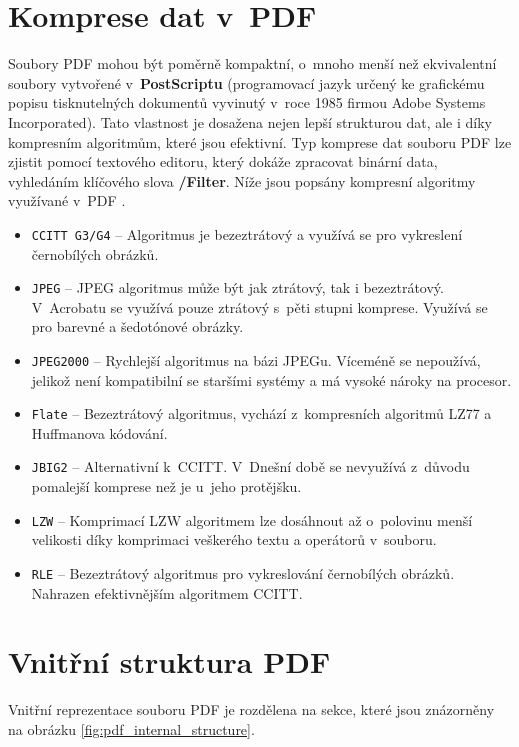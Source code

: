 \section{Komprese dat v~PDF}
\label{sec:komprese}
Soubory PDF mohou být poměrně kompaktní, o~mnoho menší než ekvivalentní soubory vytvořené v~\textbf{PostScriptu} (programovací jazyk určený ke grafickému popisu tisknutelných dokumentů vyvinutý v~roce 1985 firmou Adobe Systems Incorporated). Tato vlastnost je dosažena nejen lepší strukturou dat, ale i díky kompresním algoritmům, které jsou efektivní. Typ komprese dat souboru PDF lze zjistit pomocí textového editoru, který dokáže zpracovat binární data, vyhledáním klíčového slova \textbf{/Filter}. Níže jsou popsány kompresní algoritmy využívané v~PDF \cite{PDFPrepressure}.
\begin{itemize}
	\item \verb|CCITT G3/G4| -- Algoritmus je bezeztrátový a využívá se pro vykreslení černobílých obrázků.
	\item \verb|JPEG| -- JPEG algoritmus může být jak ztrátový, tak i bezeztrátový. V~Acrobatu se využívá pouze ztrátový s~pěti stupni komprese. Využívá se pro barevné a šedotónové obrázky.
	\item \verb|JPEG2000| -- Rychlejší algoritmus na bázi JPEGu. Víceméně se nepoužívá, jelikož není kompatibilní se staršími systémy a má vysoké nároky na procesor.
	\item \verb|Flate| -- Bezeztrátový algoritmus, vychází z~kompresních algoritmů LZ77 a Huffmanova kódování.
	\item \verb|JBIG2| -- Alternativní k~CCITT. V~Dnešní době se nevyužívá z~důvodu pomalejší komprese než je u~jeho protějšku.
	\item \verb|LZW| -- Komprimací LZW algoritmem lze dosáhnout až o~polovinu menší velikosti díky komprimaci veškerého textu a operátorů v~souboru.
	\item \verb|RLE| -- Bezeztrátový algoritmus pro vykreslování černobílých obrázků. Nahrazen efektivnějším algoritmem CCITT.
\end{itemize}

\section{Vnitřní struktura PDF}
\label{subsec:vnitrni_struktura}
Vnitřní reprezentace souboru PDF je rozdělena na sekce, které jsou znázorněny na obrázku \ref{fig:pdf_internal_structure}.

